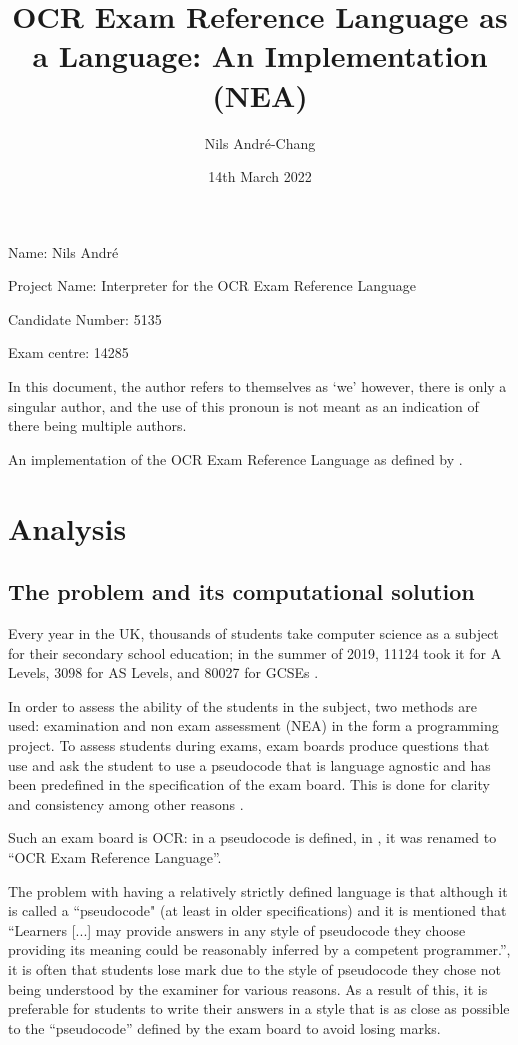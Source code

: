 \documentclass{article}
\author{Nils André-Chang}
\title{OCR Exam Reference Language as a Language: An Implementation (NEA)}
\date{14th March 2022}
\begin{document}
Name: Nils André

Project Name: Interpreter for the OCR Exam Reference Language

Candidate Number: 5135

Exam centre: 14285

\maketitle

\tableofcontents

\listoffigures

\listoflistings

\listoftables

In this document, the author refers to themselves as `we' however, there is
only a singular author, and the use of this pronoun is not meant as an
indication of there being multiple authors.

An implementation of the OCR Exam Reference Language as defined by
\textcite{j277, h446}.

\section{Analysis}

\subsection{The problem and its computational solution}

Every year in the UK, thousands of students take computer science as a subject
for their secondary school education; in the summer of 2019, 11124 took it for
A Levels, 3098 for AS Levels, and 80027 for GCSEs
\cite{jcqalevel19, jcqgcse19}.

In order to assess the ability of the students in the subject, two methods are
used: examination and non exam assessment (NEA) in the form a programming
project. To assess students during exams, exam boards produce questions that
use and ask the student to use a pseudocode that is language agnostic and has
been predefined in the specification of the exam board. This is done for
clarity and consistency among other reasons \cite{h446, j276, j277}.

Such an exam board is OCR: in \textcite{h446, j276, j277} a pseudocode is
defined, in \textcite{j277}, it was renamed to ``OCR Exam Reference Language''.

The problem with having a relatively strictly defined language is that although
it is called a ``pseudocode" (at least in older specifications) and it is
mentioned that ``Learners [...] may provide answers in any style of pseudocode
they choose providing its meaning could be reasonably inferred by a competent
programmer.'', it is often that students lose mark due to the style of
pseudocode they chose not being understood by the examiner for various reasons.
As a result of this, it is preferable for students to write their answers in a
style that is as close as possible to the ``pseudocode'' defined by the exam
board to avoid losing marks.
\end{document}
